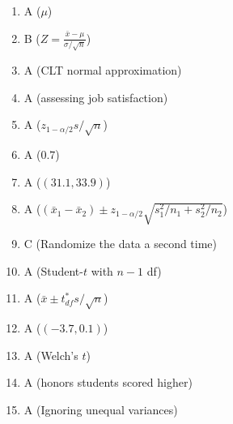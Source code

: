 \documentclass{article}
\begin{document}
\begin{enumerate}
\item A ($\mu$)
\item B ($Z=\tfrac{\bar{x}-\mu}{\sigma/\sqrt{n}}$)
\item A (CLT normal approximation)
\item A (assessing job satisfaction)
\item A ($z_{1-\alpha/2}s/\sqrt{n}$)
\item A ($0.7$)
\item A ($(31.1,33.9)$)
\item A ($(\bar{x}_1-\bar{x}_2)\pm z_{1-\alpha/2}\sqrt{s_1^2/n_1+s_2^2/n_2}$)
\item C (Randomize the data a second time)
\item A (Student-$t$ with $n-1$ df)
\item A ($\bar{x}\pm t^*_{df}s/\sqrt{n}$)
\item A ($(-3.7,0.1)$)
\item A (Welch's $t$)
\item A (honors students scored higher)
\item A (Ignoring unequal variances)
\end{enumerate}
\end{document}
